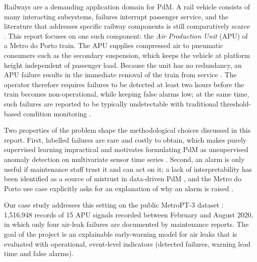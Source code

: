 \documentclass[12pt,a4paper]{article}
\begin{document}
Railways are a demanding application domain for PdM. A rail vehicle consists of many interacting subsystems, failures interrupt passenger service, and the literature that addresses specific railway components is still comparatively scarce \citep{davari2021survey}. This report focuses on one such component: the \emph{Air Production Unit} (APU) of a Metro do Porto train. The APU supplies compressed air to pneumatic consumers such as the secondary suspension, which keeps the vehicle at platform height independent of passenger load. Because the unit has no redundancy, an APU failure results in the immediate removal of the train from service \citep{veloso2022metropt}. The operator therefore requires failures to be detected at least two hours before the train becomes non-operational, while keeping false alarms low; at the same time, such failures are reported to be typically undetectable with traditional threshold-based condition monitoring \citep{veloso2022metropt}.

Two properties of the problem shape the methodological choices discussed in this report. First, labelled failures are rare and costly to obtain, which makes purely supervised learning impractical and motivates formulating PdM as unsupervised anomaly detection on multivariate sensor time series \citep{davari2021survey}. Second, an alarm is only useful if maintenance staff trust it and can act on it; a lack of interpretability has been identified as a source of mistrust in data-driven PdM \citep{vollert2021interpretable}, and the Metro do Porto use case explicitly asks for an explanation of why an alarm is raised \citep{silva2023adversarial}.

Our case study addresses this setting on the public MetroPT-3 dataset \citep{davari2021metropt3data}: 1{,}516{,}948 records of 15 APU signals recorded between February and August 2020, in which only four air-leak failures are documented by maintenance reports. The goal of the project is an explainable early-warning model for air leaks that is evaluated with operational, event-level indicators (detected failures, warning lead time and false alarms).
\end{document}
